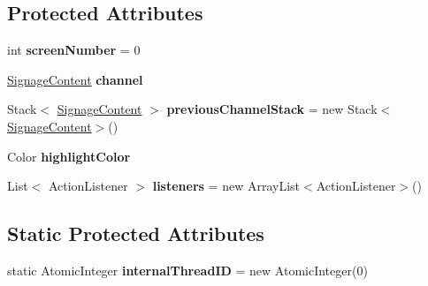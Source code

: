 \subsection*{Protected Attributes}
\begin{DoxyCompactItemize}
\item 
\hypertarget{classgov_1_1fnal_1_1ppd_1_1dd_1_1display_1_1DisplayImpl_ace620614bde13cee492129c27f38db4e}{int {\bfseries screen\-Number} = 0}\label{classgov_1_1fnal_1_1ppd_1_1dd_1_1display_1_1DisplayImpl_ace620614bde13cee492129c27f38db4e}

\item 
\hypertarget{classgov_1_1fnal_1_1ppd_1_1dd_1_1display_1_1DisplayImpl_a190a737d7c69248d533e0dc016dcd755}{\hyperlink{interfacegov_1_1fnal_1_1ppd_1_1dd_1_1signage_1_1SignageContent}{Signage\-Content} {\bfseries channel}}\label{classgov_1_1fnal_1_1ppd_1_1dd_1_1display_1_1DisplayImpl_a190a737d7c69248d533e0dc016dcd755}

\item 
\hypertarget{classgov_1_1fnal_1_1ppd_1_1dd_1_1display_1_1DisplayImpl_a1732d577755dfc58b9762a41599fa4ed}{Stack$<$ \hyperlink{interfacegov_1_1fnal_1_1ppd_1_1dd_1_1signage_1_1SignageContent}{Signage\-Content} $>$ {\bfseries previous\-Channel\-Stack} = new Stack$<$\hyperlink{interfacegov_1_1fnal_1_1ppd_1_1dd_1_1signage_1_1SignageContent}{Signage\-Content}$>$()}\label{classgov_1_1fnal_1_1ppd_1_1dd_1_1display_1_1DisplayImpl_a1732d577755dfc58b9762a41599fa4ed}

\item 
\hypertarget{classgov_1_1fnal_1_1ppd_1_1dd_1_1display_1_1DisplayImpl_af12ff2aa5231a9bb08e12b1dbd0dea7c}{Color {\bfseries highlight\-Color}}\label{classgov_1_1fnal_1_1ppd_1_1dd_1_1display_1_1DisplayImpl_af12ff2aa5231a9bb08e12b1dbd0dea7c}

\item 
\hypertarget{classgov_1_1fnal_1_1ppd_1_1dd_1_1display_1_1DisplayImpl_aa4a7dad0a486d2f888cf47921423e2c1}{List$<$ Action\-Listener $>$ {\bfseries listeners} = new Array\-List$<$Action\-Listener$>$()}\label{classgov_1_1fnal_1_1ppd_1_1dd_1_1display_1_1DisplayImpl_aa4a7dad0a486d2f888cf47921423e2c1}

\end{DoxyCompactItemize}
\subsection*{Static Protected Attributes}
\begin{DoxyCompactItemize}
\item 
\hypertarget{classgov_1_1fnal_1_1ppd_1_1dd_1_1display_1_1DisplayImpl_ad88d25a9ab5f40882542b19846f83bf3}{static Atomic\-Integer {\bfseries internal\-Thread\-I\-D} = new Atomic\-Integer(0)}\label{classgov_1_1fnal_1_1ppd_1_1dd_1_1display_1_1DisplayImpl_ad88d25a9ab5f40882542b19846f83bf3}

\end{DoxyCompactItemize}


